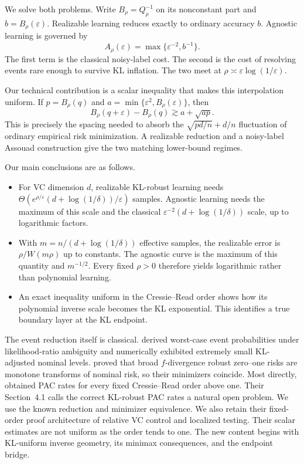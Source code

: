 \documentclass{article}
\theoremstyle{remark}
\newcommand{\eps}{\varepsilon}
\begin{document}
We solve both problems.  Write $B_\rho=Q_\rho^{-1}$ on its nonconstant part and $b=B_\rho(\eps)$.  Realizable learning reduces exactly to ordinary accuracy $b$.  Agnostic learning is governed by \[ A_\rho(\eps)=\max\{\eps^{-2},b^{-1}\}. \] The first term is the classical noisy-label cost.  The second is the cost of resolving events rare enough to survive KL inflation.  The two meet at $\rho\asymp\eps\log(1/\eps)$.

Our technical contribution is a scalar inequality that makes this interpolation uniform.  If $p=B_\rho(q)$ and $a=\min\{\eps^2,B_\rho(\eps)\}$, then
\begin{equation}
 B_\rho(q+\eps)-B_\rho(q)
 \gtrsim a+\sqrt{ap}.
 \label{eq:intro-spacing}
\end{equation}
This is precisely the spacing needed to absorb the $\sqrt{p d/n}+d/n$ fluctuation of ordinary empirical risk minimization.  A realizable reduction and a noisy-label Assouad construction give the two matching lower-bound regimes.

Our main conclusions are as follows.
\begin{itemize}
\item For VC dimension $d$, realizable KL-robust learning needs
$\Theta(e^{\rho/\eps}(d+\log(1/\delta))/\eps)$ samples.  Agnostic learning needs the maximum of this scale and the classical $\eps^{-2}(d+\log(1/\delta))$ scale, up to logarithmic factors.
\item With $m=n/(d+\log(1/\delta))$ effective samples, the realizable error is
$\rho/W(m\rho)$ up to constants.  The agnostic curve is the maximum of this quantity and $m^{-1/2}$.  Every fixed $\rho>0$ therefore yields logarithmic rather than polynomial learning.
\item An exact inequality uniform in the Cressie--Read order shows how its
polynomial inverse scale becomes the KL exponential.  This identifies a true boundary layer at the KL endpoint.
\end{itemize}

The event reduction itself is classical.  \citet{huhongso2013ambiguous} derived worst-case event probabilities under likelihood-ratio ambiguity and numerically exhibited extremely small KL-adjusted nominal levels. \citet{hu2018distributionally} proved that broad $f$-divergence robust zero--one risks are monotone transforms of nominal risk, so their minimizers coincide.  Most directly, \citet{aignerhorev2026cressie} obtained PAC rates for every fixed Cressie--Read order above one.  Their Section~4.1 calls the correct KL-robust PAC rates a natural open problem.  We use the known reduction and minimizer equivalence.  We also retain their fixed-order proof architecture of relative VC control and localized testing.  Their scalar estimates are not uniform as the order tends to one.  The new content begins with KL-uniform inverse geometry, its minimax consequences, and the endpoint bridge.
\end{document}
